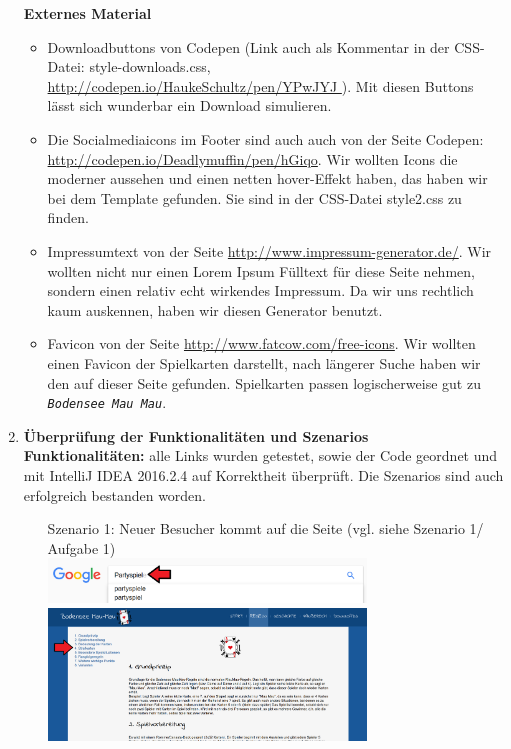 \documentclass{scrartcl}
\newcommand{\BMM}{\texttt{\textit{Bodensee Mau Mau}}}
\begin{document}
\begin{enumerate}
\textbf{Externes Material}
\begin{itemize}
\item Downloadbuttons von Codepen (Link auch als Kommentar in der CSS-Datei: style-downloads.css, \url{http://codepen.io/HaukeSchultz/pen/YPwJYJ }). Mit diesen Buttons lässt sich wunderbar ein Download simulieren.
\item Die Socialmediaicons im Footer sind auch auch von der Seite Codepen: \url{http://codepen.io/Deadlymuffin/pen/hGiqo}. Wir wollten Icons die moderner aussehen und einen netten hover-Effekt haben, das haben wir bei dem Template gefunden. Sie sind in der CSS-Datei style2.css zu finden.
\item Impressumtext von der Seite \url{http://www.impressum-generator.de/}. Wir wollten nicht nur einen Lorem Ipsum Fülltext für diese Seite nehmen, sondern einen relativ echt wirkendes Impressum. Da wir uns rechtlich kaum auskennen, haben wir diesen Generator benutzt.
\item Favicon von der Seite \url{http://www.fatcow.com/free-icons}. Wir wollten einen Favicon der Spielkarten darstellt, nach längerer Suche haben wir den auf dieser Seite gefunden. Spielkarten passen logischerweise gut zu \BMM .
\end{itemize}
\item \textbf{Überprüfung der Funktionalitäten und Szenarios}\\
\textbf{Funktionalitäten:} alle Links wurden getestet, sowie der Code geordnet und mit IntelliJ IDEA 2016.2.4 auf Korrektheit überprüft. 
Die Szenarios sind auch erfolgreich bestanden worden.
\begin{itemize}
\item[Szenario 1:]
Neuer Besucher kommt auf die Seite (vgl. siehe Szenario 1/ Aufgabe 1) \\
\includegraphics[width=0.7\textwidth]{screenshot_7_1_1.png} \\
\includegraphics[width=0.7\textwidth]{screenshot_7_2_1.png} 

\end{itemize}
\end{enumerate}
\end{document}
